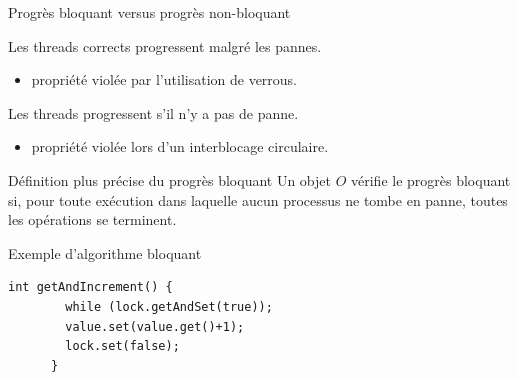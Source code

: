 
\begingroup

\begin{frame}[fragile]{Progrès bloquant versus progrès non-bloquant}

  \begin{description}
  \item[Progrès non-bloquant :] Les threads corrects progressent \alert{malgré les pannes}.
    \begin{itemize}
    \item propriété violée par l'utilisation de verrous.
    \end{itemize}
  \item[Progrès bloquant :] Les threads progressent \alert{s'il n'y a pas de panne}.
    \begin{itemize}
    \item propriété violée lors d'un interblocage circulaire.
    \end{itemize}
  \end{description}
  
  \begin{block}{Définition plus précise du progrès bloquant}
    Un objet $O$ vérifie le progrès bloquant si,
    pour toute exécution dans laquelle aucun processus ne tombe en panne,
    toutes les opérations se terminent.
  \end{block}

  \begin{exampleblock}{Exemple d'algorithme bloquant}
    \begin{lstlisting}[gobble=6]
      int getAndIncrement() {
        while (lock.getAndSet(true));
        value.set(value.get()+1);
        lock.set(false);
      }
    \end{lstlisting}
  \end{exampleblock}

\end{frame}

\endgroup
\endinput
